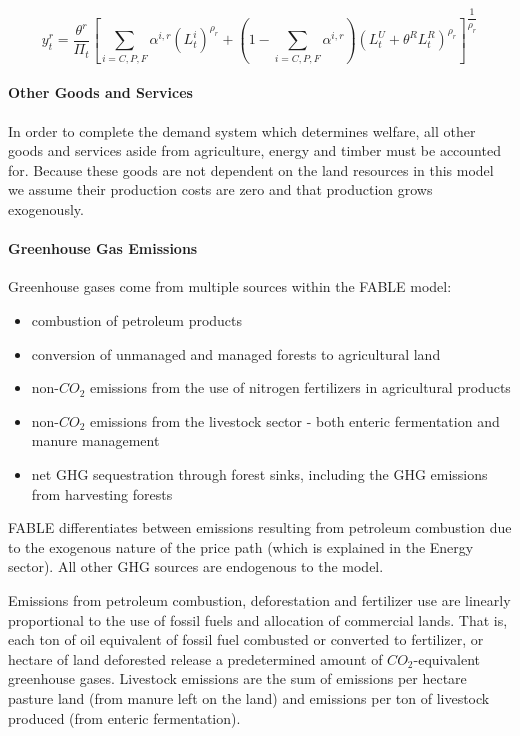 \documentclass[10pt]{article}
\begin{document}
\begin{equation}
y_t^r = \dfrac{\theta^r}{\Pi_t} \left [ \sum \limits_{i= C, P, F} \alpha^{i,r} \left (L_t^i \right )^{\rho_r} + \left (1- \sum \limits_{i = C, P, F} \alpha^{i, r} \right ) \left (L_t^U + \theta^R L_t^R \right )^{\rho_r} \right ] ^{\dfrac{1}{\rho_r}}
\end{equation}


\paragraph{Other Goods and Services}

In order to complete the demand system which determines welfare, all other goods and services aside from agriculture, energy and timber must be accounted for. Because these goods are not dependent on the land resources in this model we assume their production costs are zero and that production grows exogenously. 


\paragraph{Greenhouse Gas Emissions}

Greenhouse gases come from multiple sources within the FABLE model:
\begin{itemize}
\item combustion of petroleum products
\item conversion of unmanaged and managed forests to agricultural land
\item non-$CO_2$ emissions from the use of nitrogen fertilizers in agricultural products
\item non-$CO_2$ emissions from the livestock sector - both enteric fermentation and manure management
\item net GHG sequestration through forest sinks, including the GHG emissions from harvesting forests
\end{itemize}

FABLE differentiates between emissions resulting from petroleum combustion due to the exogenous nature of the price path (which is explained in the Energy sector). All other GHG sources are endogenous to the model. 

Emissions from petroleum combustion, deforestation and fertilizer use are linearly proportional to the use of fossil fuels and allocation of commercial lands. That is, each ton of oil equivalent of fossil fuel combusted or converted to fertilizer, or hectare of land deforested release a predetermined amount of $CO_2$-equivalent greenhouse gases. Livestock emissions are the sum of emissions per hectare pasture land (from manure left on the land) and emissions per ton of livestock produced (from enteric fermentation). 
\end{document}
